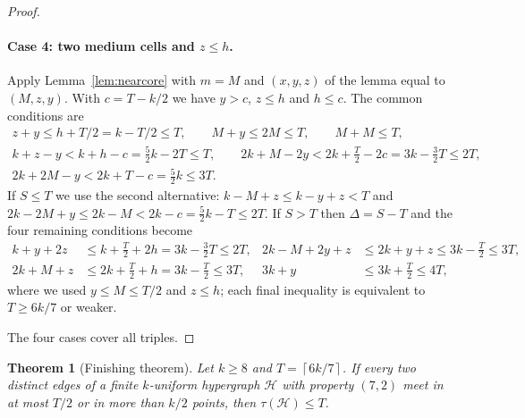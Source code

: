\documentclass[11pt]{article}
\numberwithin{equation}{section}
\newtheorem{theorem}{Theorem}[section]
\theoremstyle{definition}
\theoremstyle{remark}
\newcommand{\HH}{\mathcal H}
\newcommand{\ceil}[1]{\left\lceil #1\right\rceil}
\begin{document}
\begin{proof}
\paragraph{Case 4: two medium cells and $z\le h$.}
Apply Lemma~\ref{lem:nearcore} with $m=M$ and $(x,y,z)$ of the lemma equal
to $(M,z,y)$. With $c=T-k/2$ we have $y>c$, $z\le h$ and $h\le c$. The
common conditions are
\begin{gather*}
 z+y\le h+T/2=k-T/2\le T,\qquad M+y\le2M\le T,\qquad M+M\le T,\\
 k+z-y<k+h-c=\tfrac52k-2T\le T,\qquad
 2k+M-2y<2k+\tfrac T2-2c=3k-\tfrac32T\le2T,\\
 2k+2M-y<2k+T-c=\tfrac52k\le3T .
\end{gather*}
If $S\le T$ we use the second alternative:
$k-M+z\le k-y+z<T$ and $2k-2M+y\le2k-M<2k-c=\tfrac52k-T\le2T$. If $S>T$
then $\Delta=S-T$ and the four remaining conditions become
\begin{align*}
 k+y+2z&\le k+\tfrac T2+2h=3k-\tfrac32T\le2T,&
 2k-M+2y+z&\le2k+y+z\le3k-\tfrac T2\le3T,\\
 2k+M+z&\le2k+\tfrac T2+h=3k-\tfrac T2\le3T,&
 3k+y&\le3k+\tfrac T2\le4T,
\end{align*}
where we used $y\le M\le T/2$ and $z\le h$; each final inequality is
equivalent to $T\ge6k/7$ or weaker.

The four cases cover all triples.
\end{proof}

\begin{theorem}[Finishing theorem]\label{thm:finish}
Let $k\ge8$ and $T=\ceil{6k/7}$. If every two distinct edges of a finite
$k$-uniform hypergraph $\HH$ with property $(7,2)$ meet in at most $T/2$
or in more than $k/2$ points, then $\tau(\HH)\le T$.
\end{theorem}
\end{document}
